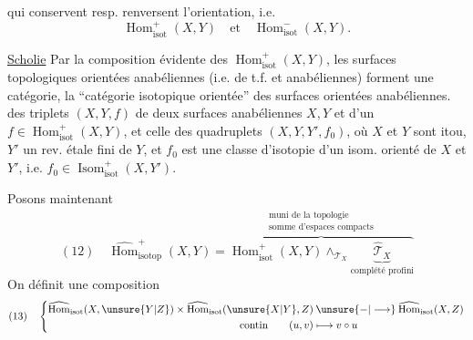 qui conservent resp. renversent l'orientation, i.e.
\[
\operatorname{Hom}_{\mathrm{isot}}^+(X,Y)\quad\text{et}\quad\operatorname{Hom}_{\mathrm{isot}}^-(X,Y).
\]

\uline{Scholie} Par la composition évidente des $\operatorname{Hom}_{\mathrm{isot}}^+(X,Y)$, les surfaces topologiques orientées anabéliennes (i.e. de t.f. et anabéliennes)  forment une catégorie, la ``catégorie isotopique orientée'' des surfaces orientées anabéliennes.   des triplets $(X,Y,f)$ de deux surfaces  anabéliennes $X,Y$ et d'un $f\in\operatorname{Hom}_{\mathrm{isot}}^+(X,Y)$, et celle des quadruplets $(X,Y,Y',f_0)$, où $X$ et $Y$ sont itou, $Y'$ un rev. étale fini de $Y$, et $f_0$ est une classe d'isotopie d'un isom. orienté de $X$ et $Y'$, i.e. $f_0\in\operatorname{Isom}_{\mathrm{isot}}^+(X,Y')$.

Posons maintenant
\[
(12)\quad
\widehat{\operatorname{Hom}}^{+}_{\mathrm{isotop}}(X,Y)
=\overbrace{\operatorname{Hom}^{+}_{\mathrm{isot}}(X,Y)\mathop{\wedge}_{\mathcal{T}_X}
\underbrace{\widehat{\mathcal{T}}_X}_{\text{complété profini}}}^{\substack{\text{muni de la topologie}\\\text{somme d'espaces compacts}}}
\]
On définit une composition
\[
(13)\quad\left\{
\begin{aligned}
\widehat{\operatorname{Hom}}_{\mathrm{isot}}(X,\unsure{Y|Z})\times
\widehat{\operatorname{Hom}}_{\mathrm{isot}}(\unsure{X|Y},Z)
&\mathbin{\unsure{-|\longrightarrow}}\widehat{\operatorname{Hom}}_{\mathrm{isot}}(X,Z)\\
\text{contin}\qquad (u,v)&\longmapsto v\circ u
\end{aligned}\right.
\]
